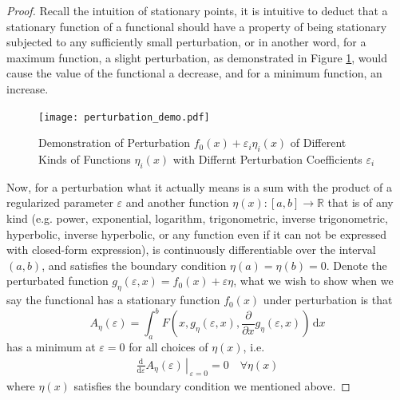 \documentclass[12pt,a4paper]{article}
\begin{document}
\begin{proof}
Recall the intuition of stationary points, it is intuitive to deduct that a stationary function of a functional should have a property of being stationary subjected to any sufficiently small perturbation, or in another word, for a maximum function, a slight perturbation, as demonstrated in Figure \ref{fig:perturbation_demo}, would cause the value of the functional a decrease, and for a minimum function, an increase.

\begin{figure}[!htbp]
    \centering
    \texttt{[image: perturbation\_demo.pdf]}
    \caption{Demonstration of Perturbation $f_0(x)+\varepsilon_i\eta_i(x)$ of Different Kinds of Functions $\eta_i(x)$ with Differnt Perturbation Coefficients $\varepsilon_i$}
    \label{fig:perturbation_demo}
\end{figure}

Now, for a perturbation what it actually means is a sum with the product of a regularized parameter $\varepsilon$ and another function $\eta(x):[a,b]\to\mathbb{R}$ that is of any kind (e.g. power, exponential, logarithm, trigonometric, inverse trigonometric, hyperbolic, inverse hyperbolic, or any function even if it can not be expressed with closed-form expression), is continuously differentiable over the interval $(a,b)$, and satisfies the boundary condition $\eta(a)=\eta(b)=0$. Denote the perturbated function $g_\eta(\varepsilon,x)=f_0(x)+\varepsilon\eta$, what we wish to show when we say the functional has a stationary function $f_0(x)$ under perturbation is that
\[
A_\eta(\varepsilon)=\int_a^bF\left(x,g_\eta(\varepsilon,x),\frac{\partial}{\partial x}g_\eta(\varepsilon,x)\right)\,\mathrm{d}x
\]
has a minimum at $\varepsilon=0$ for all choices of $\eta(x)$, i.e.
\begin{gather}
\label{eqn:cond_stationary_function_under_perturbation}
\left.\frac{\mathrm{d}}{\mathrm{d}\varepsilon}A_\eta(\varepsilon)\,\right|_{\,\varepsilon=0}=0\quad\forall\eta(x)
\end{gather}
where $\eta(x)$ satisfies the boundary condition we mentioned above.


\end{proof}
\end{document}
